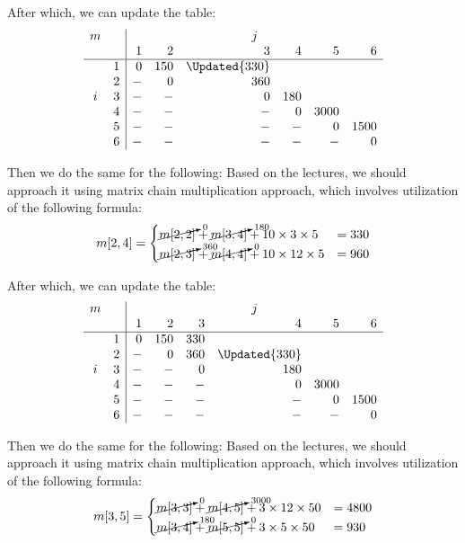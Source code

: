 After which, we can update the table:
\[
\begin{array}{cc|rrrrrr}
m &   & \multicolumn{6}{c}{j}                          \\
  &   &  1   &  2  &       3       &  4  &   5  &   6  \\
\hline
  & 1 &  0   & 150 & \Updated{330} &     &      &      \\
  & 2 &  -   &  0  &      360      &     &      &      \\
i & 3 &  -   &  -  &       0       & 180 &      &      \\
  & 4 &  -   &  -  &       -       &  0  & 3000 &      \\
  & 5 &  -   &  -  &       -       &  -  &   0  & 1500 \\
  & 6 &  -   &  -  &       -       &  -  &   -  &   0
\end{array}
\]

Then we do the same for the following:
Based on the lectures, we should approach it using matrix chain multiplication
approach, which involves utilization of the following formula:
$$
    m[2, 4] =
    \begin{cases}
        \cancelto{0}{m[2, 2]}   + \cancelto{180}{m[3, 4]} + 10 \times  3 \times 5  & = 330 \\
        \cancelto{360}{m[2, 3]} + \cancelto{0}{m[4, 4]}   + 10 \times 12 \times 5  & = 960
    \end{cases}
$$

After which, we can update the table:
\[
\begin{array}{cc|rrrrrr}
m &   & \multicolumn{6}{c}{j}                          \\
  &   &  1   &  2  &  3  &      4        &   5  &   6  \\
\hline
  & 1 &  0   & 150 & 330 &               &      &      \\
  & 2 &  -   &  0  & 360 & \Updated{330} &      &      \\
i & 3 &  -   &  -  &  0  &     180       &      &      \\
  & 4 &  -   &  -  &  -  &      0        & 3000 &      \\
  & 5 &  -   &  -  &  -  &      -        &   0  & 1500 \\
  & 6 &  -   &  -  &  -  &      -        &   -  &   0
\end{array}
\]

Then we do the same for the following:
Based on the lectures, we should approach it using matrix chain multiplication
approach, which involves utilization of the following formula:
$$
    m[3, 5] =
    \begin{cases}
        \cancelto{0}{m[3, 3]}   + \cancelto{3000}{m[4, 5]} + 3 \times 12 \times 50  & = 4800 \\
        \cancelto{180}{m[3, 4]} + \cancelto{0}{m[5, 5]}    + 3 \times  5 \times 50  & =  930
    \end{cases}
$$

